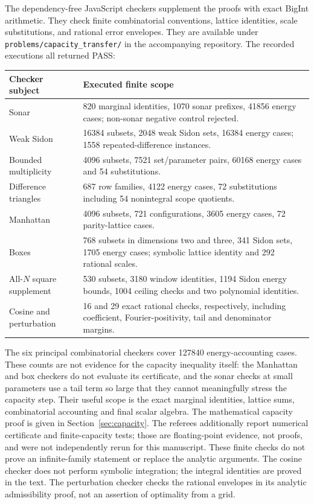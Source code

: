 \documentclass[10pt]{article}
\numberwithin{equation}{section}
\theoremstyle{remark}
\begin{document}
The dependency-free JavaScript checkers supplement the proofs with
exact BigInt arithmetic. They check finite combinatorial conventions,
lattice identities, scale substitutions, and rational error envelopes.
They are available under \texttt{problems/capacity\_transfer/} in
the accompanying repository.
The recorded executions all returned PASS:
\begin{center}\small
\begin{tabular}{@{}p{}p{}@{}}
\toprule
Checker subject & Executed finite scope\\
\midrule
Sonar & 820 marginal identities, 1070 sonar prefixes, 41856 energy cases;
non-sonar negative control rejected.\\
Weak Sidon & 16384 subsets, 2048 weak Sidon sets, 16384 energy cases;
1558 repeated-difference instances.\\
Bounded multiplicity & 4096 subsets, 7521 set/parameter pairs,
60168 energy cases and 54 substitutions.\\
Difference triangles & 687 row families, 4122 energy cases,
72 substitutions including 54 nonintegral scope quotients.\\
Manhattan & 4096 subsets, 721 configurations, 3605 energy cases,
72 parity-lattice cases.\\
Boxes & 768 subsets in dimensions two and three, 341 Sidon sets,
1705 energy cases; symbolic lattice identity and 292 rational scales.\\
All-$N$ square supplement & 530 subsets, 3180 window identities,
1194 Sidon energy bounds, 1004 ceiling checks and two polynomial identities.\\
Cosine and perturbation & 16 and 29 exact rational checks, respectively,
including coefficient, Fourier-positivity, tail and denominator margins.\\
\bottomrule
\end{tabular}
\end{center}
The six principal combinatorial checkers cover 127840 energy-accounting cases.
These counts are not evidence for the capacity inequality itself:
the Manhattan and box checkers do not evaluate its certificate, and
the sonar checks at small parameters use a tail term so large that
they cannot meaningfully stress the capacity step. Their useful scope
is the exact marginal identities, lattice sums, combinatorial accounting
and final scalar algebra. The mathematical capacity proof is given in
Section~\ref{sec:capacity}. The referees additionally report numerical
certificate and finite-capacity tests; those are floating-point evidence,
not proofs, and were not independently rerun for this manuscript.
These finite checks do not prove an infinite-family statement or
replace the analytic arguments. The cosine checker does not perform
symbolic integration; the integral identities are proved in the text.
The perturbation checker checks the rational envelopes in its analytic
admissibility proof, not an assertion of optimality from a grid.
\end{document}
